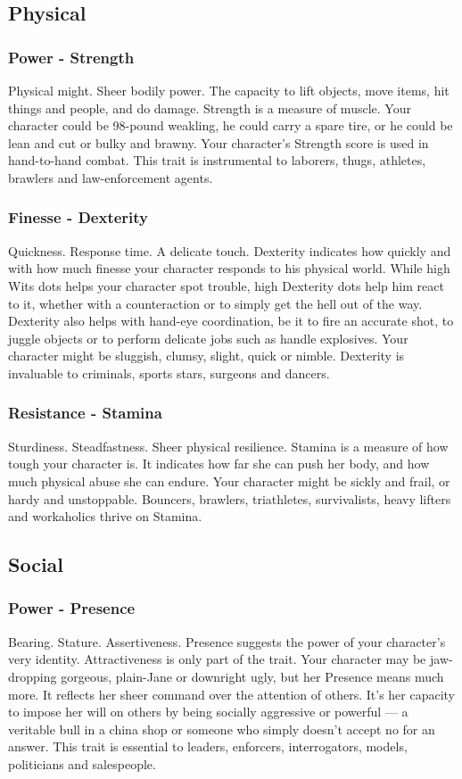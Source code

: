 \documentclass["../Misguided by Starlight.tex"]{subfiles}
\begin{document}
\subsection{Physical}
\subsubsection{Power - Strength}
Physical might. Sheer bodily power. The capacity to lift objects, move items, hit things and people, and do damage. Strength is a measure of muscle. Your character could be 98-pound weakling, he could carry a spare tire, or he could be lean and cut or bulky and brawny. Your character's Strength score is used in hand-to-hand combat. This trait is instrumental to laborers, thugs, athletes, brawlers and law-enforcement agents.

\subsubsection{Finesse - Dexterity}
Quickness. Response time. A delicate touch. Dexterity indicates how quickly and with how much finesse your character responds to his physical world. While high Wits dots helps your character spot trouble, high Dexterity dots help him react to it, whether with a counteraction or to simply get the hell out of the way. Dexterity also helps with hand-eye coordination, be it to fire an accurate shot, to juggle objects or to perform delicate jobs such as handle explosives. Your character might be sluggish, clumsy, slight, quick or nimble. Dexterity is invaluable to criminals, sports stars, surgeons and dancers.

\subsubsection{Resistance - Stamina}
Sturdiness. Steadfastness. Sheer physical resilience. Stamina is a measure of how tough your character is. It indicates how far she can push her body, and how much physical abuse she can endure. Your character might be sickly and frail, or hardy and unstoppable. Bouncers, brawlers, triathletes, survivalists, heavy lifters and workaholics thrive on Stamina.

\subsection{Social}
\subsubsection{Power - Presence}
Bearing. Stature. Assertiveness. Presence suggests the power of your character's very identity. Attractiveness is only part of the trait. Your character may be jaw-dropping gorgeous, plain-Jane or downright ugly, but her Presence means much more. It reflects her sheer command over the attention of others. It's her capacity to impose her will on others by being socially aggressive or powerful --- a veritable bull in a china shop or someone who simply doesn't accept no for an answer. This trait is essential to leaders, enforcers, interrogators, models, politicians and salespeople.
\end{document}
